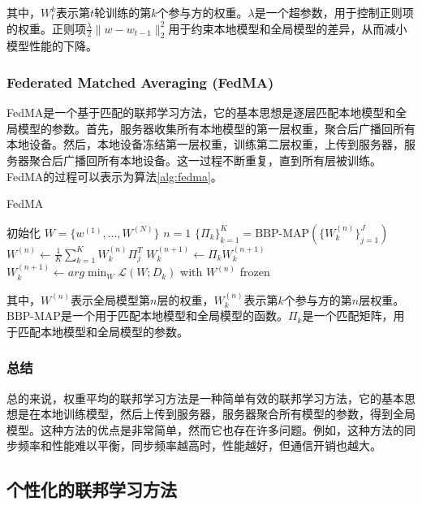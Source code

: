 其中，$W_t^k$表示第$t$轮训练的第$k$个参与方的权重。$\lambda$是一个超参数，用于控制正则项的权重。正则项$\frac{\lambda}{2}\|w-w_{t-1}\|_2^2$用于约束本地模型和全局模型的差异，从而减小模型性能的下降。

\subsubsection{Federated Matched Averaging (FedMA)}

FedMA\cite{wang2020federated}是一个基于匹配的联邦学习方法，它的基本思想是逐层匹配本地模型和全局模型的参数。首先，服务器收集所有本地模型的第一层权重，聚合后广播回所有本地设备。然后，本地设备冻结第一层权重，训练第二层权重，上传到服务器，服务器聚合后广播回所有本地设备。这一过程不断重复，直到所有层被训练。FedMA的过程可以表示为算法\ref{alg:fedma}。

\begin{algorithm}[htbp]
\caption{FedMA}
\label{alg:fedma}
\begin{algorithmic}[1]
    \State 初始化 $W=\{w^{(1)},\dots,W^{(N)}\}$
    \State $n=1$
        \State $\{\Pi_k\}_{k=1}^K=\text{BBP-MAP}(\{W_k^{(n)}\}_{j=1}^J)$
        \State $W^{(n)}\leftarrow \frac{1}{K}\sum_{k=1}^K W_k^{(n)}\Pi_j^T$
            \State $W_{k}^{(n+1)}\leftarrow \Pi_{k}W_{k}^{(n+1)}$
            \State $W_{k}^{(n+1)}\leftarrow arg\min_W \mathcal{L}(W;D_k)$ with $W^{(n)}$ frozen
        \EndFor
    \EndWhile
\end{algorithmic}
\end{algorithm}

其中，$W^{(n)}$表示全局模型第$n$层的权重，$W_k^{(n)}$表示第$k$个参与方的第$n$层权重。$\text{BBP-MAP}$是一个用于匹配本地模型和全局模型的函数。$\Pi_k$是一个匹配矩阵，用于匹配本地模型和全局模型的参数。

\subsubsection{总结}

总的来说，权重平均的联邦学习方法是一种简单有效的联邦学习方法，它的基本思想是在本地训练模型，然后上传到服务器，服务器聚合所有模型的参数，得到全局模型。这种方法的优点是非常简单，然而它也存在许多问题。例如，这种方法的同步频率和性能难以平衡，同步频率越高时，性能越好，但通信开销也越大。

\subsection{个性化的联邦学习方法}


